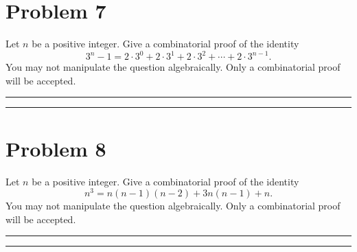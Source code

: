 \documentclass{article}
\theoremstyle{definition}
\newenvironment{solution}{\bigskip\hrule{\hfill}}{\bigskip\hrule{\hfill}} %
\begin{document}

\newpage


\section*{Problem 7}
Let $n$ be a positive integer. Give a combinatorial proof of the identity $$3^n-1=2\cdot3^0+2\cdot3^1+2\cdot3^2+\cdots+2\cdot3^{n-1}.$$ You may not manipulate the question algebraically. Only a combinatorial proof will be accepted.
\begin{solution}


\end{solution}


\newpage


\section*{Problem 8}
Let $n$ be a positive integer. Give a combinatorial proof of the identity $$n^3=n\left(n-1\right)\left(n-2\right)+3n\left(n-1\right)+n.$$ You may not manipulate the question algebraically. Only a combinatorial proof will be accepted.
\begin{solution}


\end{solution}

\end{document}
